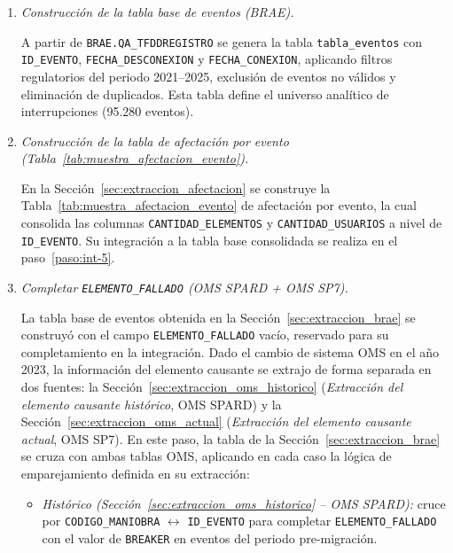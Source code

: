     {\sloppy
    \renewcommand{\theenumi}{\thesubsection.\arabic{enumi}}
    \renewcommand{\labelenumi}{\theenumi}
\begin{enumerate}
        \item\label{paso:int-1} \textit{Construcción de la tabla base de eventos (BRAE).}\mbox{}\par\vspace{0.2em}\noindent
        A partir de \texttt{BRAE.QA\_TFDDREGISTRO} se genera la tabla \texttt{tabla\_eventos} con \texttt{ID\_EVENTO}, \texttt{FECHA\_DESCONEXION} y \texttt{FECHA\_CONEXION}, aplicando filtros regulatorios del periodo 2021--2025, exclusión de eventos no válidos y eliminación de duplicados. Esta tabla define el universo analítico de interrupciones (95{.}280 eventos).
    
        \item\label{paso:int-2} \textit{Construcción de la tabla de afectación por evento (Tabla~\ref{tab:muestra_afectacion_evento}).}\mbox{}\par\vspace{0.2em}\noindent
        En la Sección~\ref{sec:extraccion_afectacion} se construye la Tabla~\ref{tab:muestra_afectacion_evento} de afectación por evento, la cual consolida las columnas \texttt{CANTIDAD\_ELEMENTOS} y \texttt{CANTIDAD\_USUARIOS} a nivel de \texttt{ID\_EVENTO}. Su integración a la tabla base consolidada se realiza en el paso~\ref{paso:int-5}.
    
        \item\label{paso:int-3} \textit{Completar \texttt{ELEMENTO\_FALLADO} (OMS SPARD + OMS SP7).}\mbox{}\par\vspace{0.2em}\noindent
        La tabla base de eventos obtenida en la Sección~\ref{sec:extraccion_brae} se construyó con el campo \texttt{ELEMENTO\_FALLADO} vacío, reservado para su completamiento en la integración. Dado el cambio de sistema OMS en el año 2023, la información del elemento causante se extrajo de forma separada en dos fuentes: la Sección~\ref{sec:extraccion_oms_historico} (\emph{Extracción del elemento causante histórico}, OMS SPARD) y la Sección~\ref{sec:extraccion_oms_actual} (\emph{Extracción del elemento causante actual}, OMS SP7). En este paso, la tabla de la Sección~\ref{sec:extraccion_brae} se cruza con ambas tablas OMS, aplicando en cada caso la lógica de emparejamiento definida en su extracción:
        
        \begin{itemize}
            \item \textit{Histórico (Sección~\ref{sec:extraccion_oms_historico} -- OMS SPARD):} cruce por \texttt{CODIGO\_MANIOBRA} $\leftrightarrow$ \texttt{ID\_EVENTO} para completar \texttt{ELEMENTO\_FALLADO} con el valor de \texttt{BREAKER} en eventos del periodo pre-migración.
            

\end{itemize}
\end{enumerate}}
